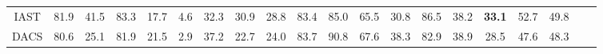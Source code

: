 \documentclass{bmvc2k}
\begin{document}
\begin{table*}[t]
{\begin{tabular}{llllllllllllllllllll}
\multicolumn{1}{c|}{IAST\cite{mei2020instance}} & \multicolumn{1}{c}{81.9} & \multicolumn{1}{c}{41.5} & \multicolumn{1}{c}{83.3} & \multicolumn{1}{c}{17.7} & \multicolumn{1}{c}{4.6} & \multicolumn{1}{c}{32.3} & \multicolumn{1}{c}{30.9} & \multicolumn{1}{c}{28.8} & \multicolumn{1}{c}{83.4} & \multicolumn{1}{c}{85.0} & \multicolumn{1}{c}{65.5} & \multicolumn{1}{c}{30.8} & \multicolumn{1}{c}{86.5} & \multicolumn{1}{c}{38.2} & \multicolumn{1}{c}{\textbf{33.1}} & \multicolumn{1}{c|}{52.7} &  \multicolumn{1}{c}{49.8} \\
\multicolumn{1}{c|}{DACS\cite{tranheden2020dacs}} & \multicolumn{1}{c}{80.6} & \multicolumn{1}{c}{25.1} & \multicolumn{1}{c}{81.9} & \multicolumn{1}{c}{21.5} & \multicolumn{1}{c}{2.9} & \multicolumn{1}{c}{37.2} & \multicolumn{1}{c}{22.7} & \multicolumn{1}{c}{24.0} & \multicolumn{1}{c}{83.7} & \multicolumn{1}{c}{90.8} & \multicolumn{1}{c}{67.6} & \multicolumn{1}{c}{38.3} & \multicolumn{1}{c}{82.9} & \multicolumn{1}{c}{38.9} & \multicolumn{1}{c}{28.5} & \multicolumn{1}{c|}{47.6} &  \multicolumn{1}{c}{48.3} \\



\end{tabular}}
\end{table*}
\end{document}
